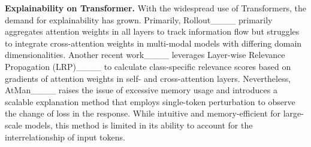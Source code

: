 \textbf{Explainability on Transformer.} With the widespread use of Transformers, the demand for explainability has grown. Primarily, Rollout____ primarily aggregates attention weights in all layers to track information flow but struggles to integrate cross-attention weights in multi-modal models with differing domain dimensionalities. Another recent work____ leverages Layer-wise Relevance Propagation (LRP)____ to calculate class-specific relevance scores based on gradients of attention weights in self- and cross-attention layers. Nevertheless, AtMan____ raises the issue of excessive memory usage and introduces a scalable explanation method that employs single-token perturbation to observe the change of loss in the response. While intuitive and memory-efficient for large-scale models, this method is limited in its ability to account for the interrelationship of input tokens.